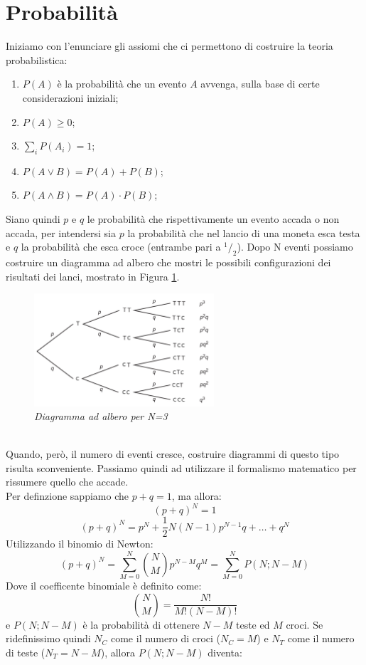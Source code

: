 \section{Probabilità}

Iniziamo con l'enunciare gli assiomi che ci permettono di costruire la teoria probabilistica:
\begin{enumerate}
  \item $P(A)$ è la probabilità che un evento $A$ avvenga, sulla base di certe considerazioni iniziali;
  \item $P(A)\geq 0$;
  \item $\sum_i P(A_i) = 1$;
  \item $P(A \lor B) = P(A) + P(B)$;
  \item $P(A \land B) = P(A) \cdot P(B)$;
\end{enumerate}
Siano quindi $p$ e $q$ le probabilità che rispettivamente un evento accada o non accada, per intendersi sia $p$ la probabilità che nel lancio di una moneta esca testa e $q$ la probabilità che esca croce (entrambe pari a $ ^1/_2$). Dopo N eventi possiamo costruire un diagramma ad albero che mostri le possibili configurazioni dei risultati dei lanci, mostrato in Figura \ref{Fig1}.
\begin{figure}[!h]
  \centering
  \includegraphics[width = 6.7cm]{img1.png}
  \caption{\textit{Diagramma ad albero per N=3}}
  \label{Fig1}
\end{figure}
\\
Quando, però, il numero di eventi cresce, costruire diagrammi di questo tipo risulta sconveniente. Passiamo quindi ad utilizzare il formalismo matematico per rissumere quello che accade.
\\Per definzione sappiamo che $p + q = 1$, ma allora:
$$(p+q)^N = 1$$
$$(p+q)^N = p^N + \frac{1}{2}N(N-1)p^{N-1}q + \dots + q^N$$
Utilizzando il binomio di Newton:
$$(p+q)^N = \sum_{M=0}^N \binom{N}{M} p^{N-M}q^M = \sum_{M=0}^N P(N;N-M)$$
Dove il coefficente binomiale è definito come:
$$\binom{N}{M} = \frac{N!}{M!(N-M)!}$$
e $P(N;N-M)$ è la probabilità di ottenere $N-M$ teste ed $M$ croci. Se ridefinissimo quindi $N_C$ come il numero di croci ($N_C = M$) e $N_T$ come il numero di teste ($N_T = N-M$), allora $P(N;N-M)$ diventa:
